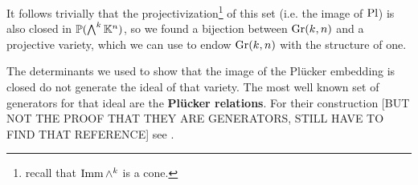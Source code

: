 \noindent
It follows trivially that the projectivization\footnote{recall that $\mathrm{Imm}\, \wedge^k$ is a cone.} of this set (i.e. the image of $\mathrm{Pl}$) is also closed in $\mathbb{P}(\bigwedge^k\mathbb{K}^n)$, so we found a bijection between $\mathrm{Gr}(k,n)$ and a projective variety, which we can use to endow $\mathrm{Gr}(k,n)$ with the structure of one.


\begin{remark}
The determinants we used to show that the image of the Pl\"ucker embedding is closed do not generate the ideal of that variety. The most well known set of generators for that ideal are the \textbf{Pl\"ucker relations}. For their construction [BUT NOT THE PROOF THAT THEY ARE GENERATORS, STILL HAVE TO FIND THAT REFERENCE] see \cite{McKernan}.
\end{remark}










